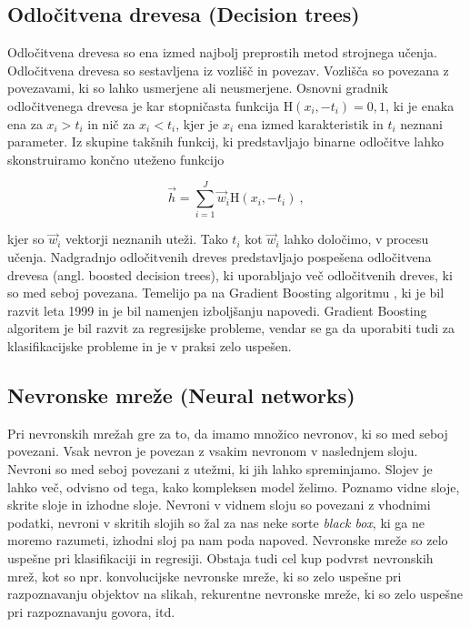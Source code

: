 \documentclass[a4paper]{article}
\begin{document}
\subsection{Odločitvena drevesa (Decision trees)}
Odločitvena drevesa so ena izmed najbolj preprostih metod strojnega učenja. Odločitvena drevesa so sestavljena iz
vozlišč in povezav. Vozlišča so povezana z povezavami, ki so lahko usmerjene ali neusmerjene. Osnovni gradnik
odločitvenega drevesa je kar stopničasta funkcija $\mathrm{H}(x_i,-t_i) = 0,1$, ki je enaka ena za $x_i > t_i$ in
nič za $x_i < t_i$, kjer je $x_i$ ena izmed karakteristik in $t_i$ neznani parameter. Iz skupine takšnih funkcij,
ki predstavljajo binarne odločitve lahko skonstruiramo končno uteženo funkcijo 

\begin{equation}
    \vec{h} = \sum_{i=1}^J{\vec{w}_i \mathrm{H}(x_i, -t_i)}\>,
\end{equation}

kjer so $\vec{w}_i$ vektorji neznanih uteži. Tako $t_i$ kot $\vec{w}_i$ lahko določimo, v procesu učenja. 
Nadgradnjo odločitvenih dreves predstavljajo pospešena odločitvena drevesa (angl. boosted decision trees), ki uporabljajo
več odločitvenih dreves, ki so med seboj povezana. Temelijo pa na Gradient Boosting algoritmu \cite{Friedman_2001}, ki je 
bil razvit leta 1999 in je bil namenjen izboljšanju napovedi. Gradient Boosting algoritem je bil razvit za regresijske 
probleme, vendar se ga da uporabiti tudi za klasifikacijske probleme in je v praksi zelo uspešen. \\

\subsection{Nevronske mreže (Neural networks)}
Pri nevronskih mrežah gre za to, da imamo množico nevronov, ki so med seboj povezani. Vsak nevron je povezan z vsakim 
nevronom v naslednjem sloju. Nevroni so med seboj povezani z utežmi, ki jih lahko spreminjamo. Slojev je lahko več,
odvisno od tega, kako kompleksen model želimo. Poznamo vidne sloje, skrite sloje in izhodne sloje. Nevroni v vidnem
sloju so povezani z vhodnimi podatki, nevroni v skritih slojih so žal za nas neke sorte \textit{black box}, ki ga
ne moremo razumeti, izhodni sloj pa nam poda napoved. Nevronske mreže so zelo uspešne pri klasifikaciji in regresiji. 
Obstaja tudi cel kup podvrst nevronskih mrež, kot so npr. konvolucijske nevronske mreže, ki so zelo uspešne pri
razpoznavanju objektov na slikah, rekurentne nevronske mreže, ki so zelo uspešne pri razpoznavanju govora, itd.\\
\end{document}
